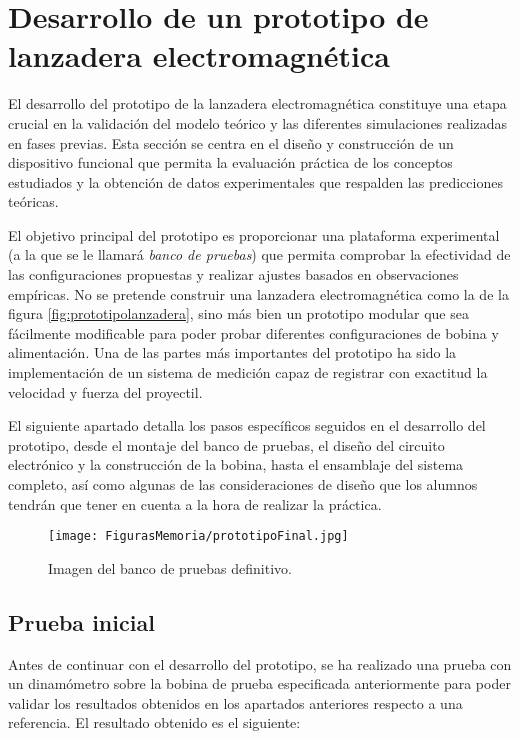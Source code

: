 \section{Desarrollo de un prototipo de lanzadera electromagnética}
\label{sec:prototipo}

El desarrollo del prototipo de la lanzadera electromagnética constituye una etapa crucial en la validación del modelo teórico y las diferentes simulaciones realizadas en fases previas. Esta sección se centra en el diseño y construcción de un dispositivo funcional que permita la evaluación práctica de los conceptos estudiados y la obtención de datos experimentales que respalden las predicciones teóricas.

El objetivo principal del prototipo es proporcionar una plataforma experimental (a la que se le llamará \textit{banco de pruebas}) que permita comprobar la efectividad de las configuraciones propuestas y realizar ajustes basados en observaciones empíricas. No se pretende construir una lanzadera electromagnética como la de la figura \ref{fig:prototipolanzadera}, sino más bien un prototipo modular que sea fácilmente modificable para poder probar diferentes configuraciones de bobina y alimentación. Una de las partes más importantes del prototipo ha sido la implementación de un sistema de medición capaz de registrar con exactitud la velocidad y fuerza del proyectil.

El siguiente apartado detalla los pasos específicos seguidos en el desarrollo del prototipo, desde el montaje del banco de pruebas, el diseño del circuito electrónico y la construcción de la bobina, hasta el ensamblaje del sistema completo, así como algunas de las consideraciones de diseño que los alumnos tendrán que tener en cuenta a la hora de realizar la práctica.

\begin{figure}[H]
    \centering
    \texttt{[image: FigurasMemoria/prototipoFinal.jpg]}
    \caption{Imagen del banco de pruebas definitivo.}
    \label{fig:prototipoFinal} %
\end{figure}

\newpage

\subsection{Prueba inicial}

Antes de continuar con el desarrollo del prototipo, se ha realizado una prueba con un dinamómetro sobre la bobina de prueba especificada anteriormente para poder validar los resultados obtenidos en los apartados anteriores respecto a una referencia. El resultado obtenido es el siguiente:


